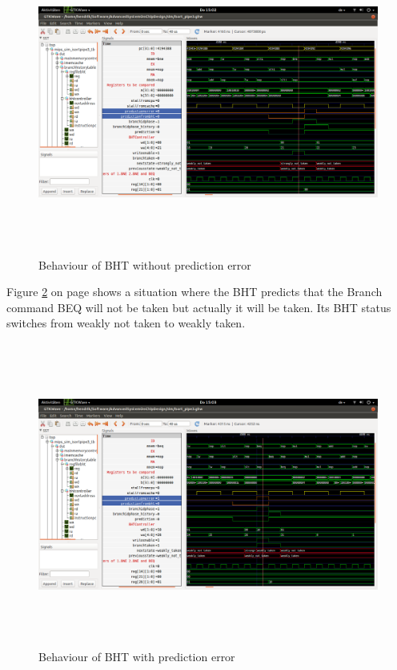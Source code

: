 \begin{figure}
	\centering
	\includegraphics[width=1\textwidth, height=10cm, keepaspectratio]{pictures/BHT_BranchNotTakenPred0Err0}
	\caption{Behaviour of BHT without prediction error}
	\label{fig5-1}
\end{figure}

Figure \ref{fig5-2} on page \pageref{fig5-2} shows a situation where the BHT predicts that the Branch command BEQ will not be taken but actually it will be taken. Its BHT status switches from weakly not taken to weakly taken.


\begin{figure}
	\centering
	\includegraphics[width=1\textwidth, height=10cm, keepaspectratio]{pictures/BHT_BranchTakenPred0Err1}
	\caption{Behaviour of BHT with prediction error}
	\label{fig5-2}
\end{figure}

